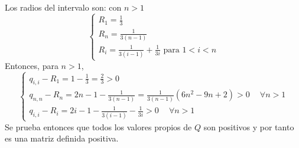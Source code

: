 \documentclass{endm}
\begin{document}
Los radios del intervalo son:
con $n > 1$
\begin{equation}
    \begin{cases}
        R_1 = \frac{1}{3} \\
        R_n = \frac{1}{3(n-1)} \\
        R_i = \frac{1}{3(i-1)} + \frac{1}{3i} \text{ para }  1<i<n
    \end{cases}
\end{equation}
Entonces, para $n > 1$,
\begin{equation}
    \begin{cases}
        q_{i,i} - R_1 = 1 - \frac{1}{3} = \frac{2}{3} > 0 \\
        q_{n,n} - R_n =  2n-1 - \frac{1}{3(n-1)} = \frac{1}{3(n-1)}(6n^2 - 9n + 2) > 0 \phantom{-}\forall n>1 \\
        q_{i,i} - R_i = 2i-1 - \frac{1}{3(i-1)} - \frac{1}{3i} > 0 \phantom{-}\forall n>1
    \end{cases}
\end{equation}
Se prueba entonces que todos los valores propios de $Q$ son positivos y por tanto es una matriz definida positiva.










\clearpage
\end{document}
